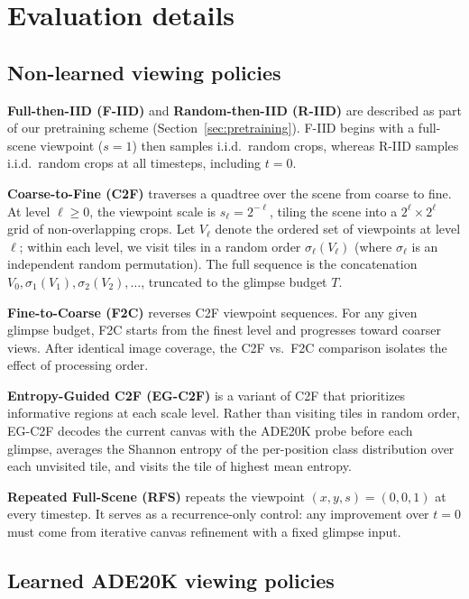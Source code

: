 \documentclass{article}
\begin{document}
\section{Evaluation details}
\label{supp:evaluation-details}

\subsection{Non-learned viewing policies}
\label{supp:policy-definitions}

\textbf{Full-then-IID (F-IID)} and \textbf{Random-then-IID (R-IID)} are described as part of our pretraining scheme (Section~\ref{sec:pretraining}).
F-IID begins with a full-scene viewpoint ($s = 1$) then samples i.i.d.\ random crops, whereas R-IID samples i.i.d.\ random crops at all timesteps, including $t = 0$.

\textbf{Coarse-to-Fine (C2F)} traverses a quadtree over the scene from coarse to fine. At level $\ell \ge 0$, the viewpoint scale is $s_\ell = 2^{-\ell}$, tiling the scene into a $2^\ell \times 2^\ell$ grid of non-overlapping crops. Let $V_\ell$ denote the ordered set of viewpoints at level $\ell$; within each level, we visit tiles in a random order $\sigma_\ell(V_\ell)$ (where $\sigma_\ell$ is an independent random permutation). The full sequence is the concatenation $V_0, \sigma_1(V_1), \sigma_2(V_2), \ldots$, truncated to the glimpse budget $T$.

\textbf{Fine-to-Coarse (F2C)} reverses C2F viewpoint sequences. For any given glimpse budget, F2C starts from the finest level and progresses toward coarser views. After identical image coverage, the C2F vs.\ F2C comparison isolates the effect of processing order.

\textbf{Entropy-Guided C2F (EG-C2F)} is a variant of C2F that prioritizes informative regions at each scale level. Rather than visiting tiles in random order, EG-C2F decodes the current canvas with the ADE20K probe before each glimpse, averages the Shannon entropy of the per-position class distribution over each unvisited tile, and visits the tile of highest mean entropy.

\textbf{Repeated Full-Scene (RFS)} repeats the viewpoint $(x, y, s) = (0, 0, 1)$ at every timestep. It serves as a recurrence-only control: any improvement over $t = 0$ must come from iterative canvas refinement with a fixed glimpse input.

\FloatBarrier
\subsection{Learned ADE20K viewing policies}
\label{supp:learned-policies}
\end{document}
